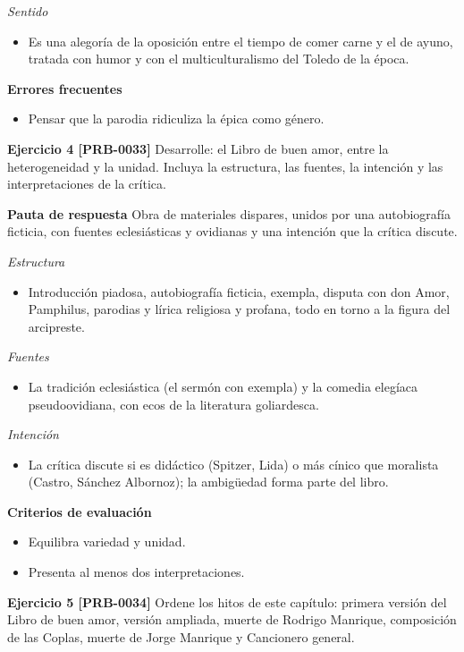 \documentclass{book}
\begin{document}
\noindent\textit{Sentido}
\begin{itemize}
\item Es una alegoría de la oposición entre el tiempo de comer carne y el de ayuno, tratada con humor y con el multiculturalismo del Toledo de la época.
\end{itemize}

\noindent\textbf{Errores frecuentes}
\begin{itemize}
\item Pensar que la parodia ridiculiza la épica como género.
\end{itemize}

\noindent\textbf{Ejercicio 4 [PRB-0033]}
Desarrolle: el Libro de buen amor, entre la heterogeneidad y la unidad. Incluya la estructura, las fuentes, la intención y las interpretaciones de la crítica.


\noindent\textbf{Pauta de respuesta}
Obra de materiales dispares, unidos por una autobiografía ficticia, con fuentes eclesiásticas y ovidianas y una intención que la crítica discute.


\noindent\textit{Estructura}
\begin{itemize}
\item Introducción piadosa, autobiografía ficticia, exempla, disputa con don Amor, Pamphilus, parodias y lírica religiosa y profana, todo en torno a la figura del arcipreste.
\end{itemize}

\noindent\textit{Fuentes}
\begin{itemize}
\item La tradición eclesiástica (el sermón con exempla) y la comedia elegíaca pseudoovidiana, con ecos de la literatura goliardesca.
\end{itemize}

\noindent\textit{Intención}
\begin{itemize}
\item La crítica discute si es didáctico (Spitzer, Lida) o más cínico que moralista (Castro, Sánchez Albornoz); la ambigüedad forma parte del libro.
\end{itemize}

\noindent\textbf{Criterios de evaluación}
\begin{itemize}
\item Equilibra variedad y unidad.
\item Presenta al menos dos interpretaciones.
\end{itemize}

\noindent\textbf{Ejercicio 5 [PRB-0034]}
Ordene los hitos de este capítulo: primera versión del Libro de buen amor, versión ampliada, muerte de Rodrigo Manrique, composición de las Coplas, muerte de Jorge Manrique y Cancionero general.
\end{document}
